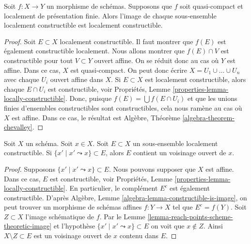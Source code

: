 \begin{theorem}
\label{theorem-chevalley}
\begin{reference}
\cite[IV, Théorème 1.8.4]{EGA}
\end{reference}
Soit $f : X \to Y$ un morphisme de schémas. Supposons
que $f$ soit quasi-compact et localement de présentation finie. Alors
l’image de chaque sous-ensemble localement constructible est localement constructible.
\end{theorem}

\begin{proof}
Soit $E \subset X$ localement constructible. Il
faut montrer que $f(E)$ est également constructible
localement. Nous allons montrer que $f(E) \cap V$ est constructible
pour tout $V \subset Y$ ouvert affine. On se réduit donc au cas où
$Y$ est affine. Dans ce cas, $X$ est quasi-compact.
On peut donc écrire $X = U_1 \cup \ldots \cup U_n$ avec chaque $U_i$
ouvert affine dans $X$. Si $E \subset X$ est localement constructible,
alors chaque
$E \cap U_i$ est constructible, voir Propriétés, Lemme \ref{properties-lemma-locally-constructible}.
Donc, puisque $f(E) = \bigcup f(E \cap U_i)$ et que les unions finies d'ensembles constructibles
sont constructibles, cela nous ramène au cas où $X$ est
affine. Dans ce cas, le résultat est
Algèbre, Théorème \ref{algebra-theorem-chevalley}.
\end{proof}

\begin{lemma}
\label{lemma-constructible-containing-open}
Soit $X$ un schéma. Soit $x \in X$. Soit $E \subset X$ un sous-ensemble
localement constructible. Si $\{x' \mid x' \leadsto x\} \subset E$, alors $E$
contient un voisinage ouvert de $x$.
\end{lemma}

\begin{proof}
Supposons $\{x' \mid x' \leadsto x\} \subset E$. Nous pouvons supposer
que $X$ est
affine. Dans ce cas, $E$
est constructible, voir Propriétés, Lemme \ref{properties-lemma-locally-constructible}.
En particulier, le complément $E^c$ est
également constructible. D'après Algèbre, Lemme \ref{algebra-lemma-constructible-is-image},
on peut trouver un morphisme de schémas affines
$f : Y \to X$ tel que $E^c = f(Y)$. Soit $Z \subset X$ l'image schématique
de $f$. Par le Lemme \ref{lemma-reach-points-scheme-theoretic-image}
et l'hypothèse $\{x' \mid x' \leadsto x\} \subset E$ on voit que $x \not \in Z$.
Ainsi $X \setminus Z \subset E$ est un voisinage ouvert de $x$
contenu dans $E$.
\end{proof}




